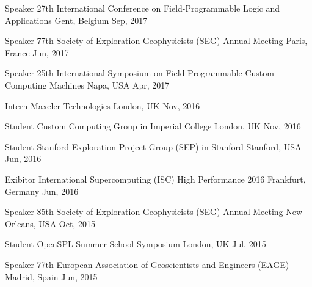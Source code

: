 \documentclass[11pt, a4paper]{awesome-cv}
\begin{document}
\begin{cvhonors}
  \cvhonor
    {Speaker} %
    {27th International Conference on Field-Programmable Logic and Applications} %
    {Gent, Belgium} %
    {Sep, 2017} %
    
  \cvhonor
    {Speaker} %
    {77th Society of Exploration Geophysicists (SEG) Annual Meeting} %
    {Paris, France} %
    {Jun, 2017} %

  \cvhonor
    {Speaker} %
    {25th International Symposium on Field-Programmable Custom Computing Machines} %
    {Napa, USA} %
    {Apr, 2017} %
    
  \cvhonor
    {Intern} %
    {Maxeler Technologies} %
    {London, UK} %
    {Nov, 2016} %
    
  \cvhonor
    {Student} %
    {Custom Computing Group in Imperial College} %
    {London, UK} %
    {Nov, 2016} %

  \cvhonor
    {Student} %
    {Stanford Exploration Project Group (SEP) in Stanford} %
    {Stanford, USA} %
    {Jun, 2016} %
    
  \cvhonor
    {Exibitor} %
    {International Supercomputing (ISC) High Performance 2016} %
    {Frankfurt, Germany} %
    {Jun, 2016} %

  \cvhonor
    {Speaker} %
    {85th Society of Exploration Geophysicists (SEG) Annual Meeting} %
    {New Orleans, USA}
    {Oct, 2015} %

  \cvhonor
    {Student} %
    {OpenSPL Summer School Symposium} %
    {London, UK} %
    {Jul, 2015} %

  \cvhonor
    {Speaker} %
    {77th European Association of Geoscientists and Engineers (EAGE)} %
    {Madrid, Spain} %
    {Jun, 2015} %
\end{cvhonors}
\end{document}
